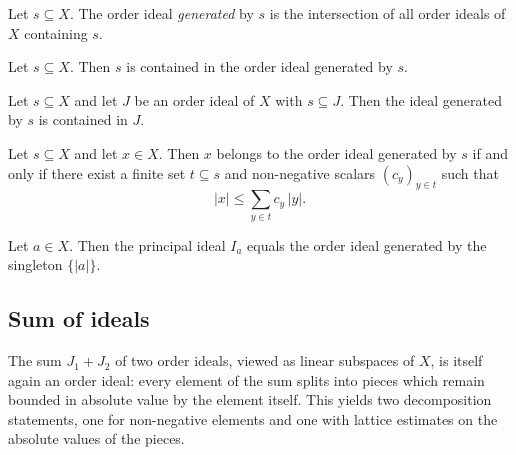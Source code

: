 \begin{definition}
\label{def:orderIdeal-generated}
\leanok
{}
Let $s \subseteq X$. The order ideal \emph{generated} by $s$ is the
intersection of all order ideals of $X$ containing $s$.
\end{definition}

\begin{lemma}
\label{lem:orderIdeal-subset-generated}
\leanok
{}
Let $s \subseteq X$. Then $s$ is contained in the order ideal
generated by $s$.
\end{lemma}

\begin{lemma}
\label{lem:orderIdeal-generated-le}
\leanok
{}
Let $s \subseteq X$ and let $J$ be an order ideal of $X$ with
$s \subseteq J$. Then the ideal generated by $s$ is contained in
$J$.
\end{lemma}

\begin{theorem}
\label{thm:orderIdeal-mem-generated-iff}
\leanok
{}
Let $s \subseteq X$ and let $x \in X$. Then $x$ belongs to the
order ideal generated by $s$ if and only if there exist a finite
set $t \subseteq s$ and non-negative scalars $(c_y)_{y \in t}$
such that
\[
  \lvert x \rvert \le \sum_{y \in t} c_y \, \lvert y \rvert.
\]
\end{theorem}

\begin{lemma}
\label{lem:orderIdeal-principal-eq-generated-abs}
\leanok
{}
Let $a \in X$. Then the principal ideal $I_a$ equals the order
ideal generated by the singleton $\{\lvert a \rvert\}$.
\end{lemma}

\subsection{Sum of ideals}

The sum $J_1 + J_2$ of two order ideals, viewed as linear subspaces
of $X$, is itself again an order ideal: every element of the sum
splits into pieces which remain bounded in absolute value by the
element itself. This yields two decomposition statements, one for
non-negative elements and one with lattice estimates on the absolute
values of the pieces.

